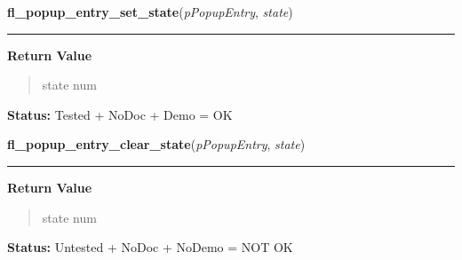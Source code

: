     \label{xformslib:flpopup:fl_popup_entry_set_state}

    \vspace{0.5ex}

\hspace{.8\funcindent}\begin{boxedminipage}{\funcwidth}

    \raggedright \textbf{fl\_popup\_entry\_set\_state}(\textit{pPopupEntry}, \textit{state})

    \vspace{-1.5ex}

    \rule{\textwidth}{0.5\fboxrule}
\setlength{\parskip}{2ex}
\setlength{\parskip}{1ex}
      \textbf{Return Value}
    \vspace{-1ex}

      \begin{quote}
      state num

      \end{quote}

\textbf{Status:} Tested + NoDoc + Demo = OK



    \end{boxedminipage}

    \label{xformslib:flpopup:fl_popup_entry_clear_state}

    \vspace{0.5ex}

\hspace{.8\funcindent}\begin{boxedminipage}{\funcwidth}

    \raggedright \textbf{fl\_popup\_entry\_clear\_state}(\textit{pPopupEntry}, \textit{state})

    \vspace{-1.5ex}

    \rule{\textwidth}{0.5\fboxrule}
\setlength{\parskip}{2ex}
\setlength{\parskip}{1ex}
      \textbf{Return Value}
    \vspace{-1ex}

      \begin{quote}
      state num

      \end{quote}

\textbf{Status:} Untested + NoDoc + NoDemo = NOT OK



    \end{boxedminipage}

